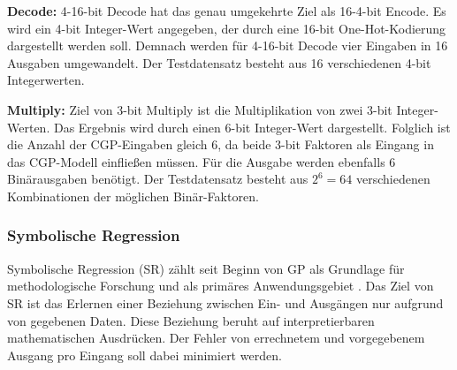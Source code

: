 \textbf{Decode:} 4-16-bit Decode hat das genau umgekehrte Ziel als 16-4-bit Encode.
Es wird ein 4-bit Integer-Wert angegeben, der durch eine 16-bit One-Hot-Kodierung dargestellt werden soll. \cite{cui_weighted_mutation}
Demnach werden für 4-16-bit Decode vier Eingaben in 16 Ausgaben umgewandelt.
Der Testdatensatz besteht aus 16 verschiedenen 4-bit Integerwerten.

\textbf{Multiply:} Ziel von 3-bit Multiply ist die Multiplikation von zwei 3-bit Integer-Werten.
Das Ergebnis wird durch einen 6-bit Integer-Wert dargestellt. \cite{cui_weighted_mutation}
Folglich ist die Anzahl der CGP-Eingaben gleich 6, da beide 3-bit Faktoren als Eingang in das CGP-Modell einfließen müssen.
Für die Ausgabe werden ebenfalls 6 Binärausgaben benötigt.
Der Testdatensatz besteht aus $2^6=64$ verschiedenen Kombinationen der möglichen Binär-Faktoren.

\subsubsection{Symbolische Regression}
\label{subsubsec:symbolicRegression}

Symbolische Regression (SR) zählt seit Beginn von GP als Grundlage für methodologische Forschung und als primäres Anwendungsgebiet \cite{orzechowski}.
Das Ziel von SR ist das Erlernen einer Beziehung zwischen Ein- und Ausgängen nur aufgrund von gegebenen Daten.
Diese Beziehung beruht auf interpretierbaren mathematischen Ausdrücken.
Der Fehler von errechnetem und vorgegebenem Ausgang pro Eingang soll dabei minimiert werden. \cite{makke_interpretable_2024}

